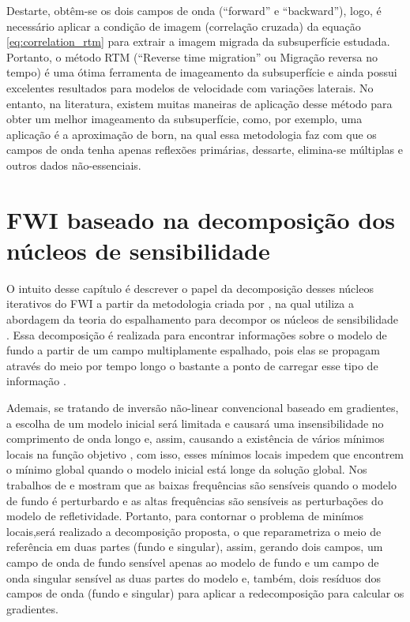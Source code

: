  Destarte, obtêm-se os dois campos de onda (``forward'' e ``backward''), logo, é necessário aplicar a condição de imagem (correlação cruzada) da equação \ref{eq:correlation_rtm} para extrair a imagem migrada da subsuperfície estudada. Portanto, o método RTM (``Reverse time migration'' ou Migração reversa no tempo) é uma ótima ferramenta de imageamento da subsuperfície e ainda possui excelentes resultados para modelos de velocidade com variações laterais. No entanto, na literatura, existem muitas maneiras de aplicação desse método para obter um melhor imageamento da subsuperfície, como, por exemplo, uma aplicação é a aproximação de born, na qual essa metodologia faz com que os campos de onda tenha apenas reflexões primárias, dessarte, elimina-se múltiplas e outros dados não-essenciais.

\section{FWI baseado na decomposição dos núcleos de sensibilidade}
O intuito desse capítulo é descrever o papel da decomposição desses núcleos iterativos do FWI a partir da metodologia criada por \citet{macedo_2014}, na qual utiliza a abordagem da teoria do espalhamento para decompor os núcleos de sensibilidade \citep{tarantola_linearized_1984}. Essa decomposição é realizada para encontrar informações sobre o  modelo de fundo a partir de um campo multiplamente espalhado, pois elas se propagam através do meio por tempo longo o bastante a ponto de carregar esse tipo de informação \citep{snieder_2002}. 

Ademais, se tratando de inversão não-linear convencional baseado em gradientes, a escolha de um modelo inicial será limitada e causará uma insensibilidade no comprimento de onda longo \citep{gauthier_1986,mora_1987,claerbout_1976,jannane_1989} e, assim, causando a existência de vários mínimos locais na função objetivo \citep{bunks_1995}, com isso, esses mínimos locais impedem que encontrem o mínimo global quando o modelo inicial está longe da solução global. Nos trabalhos de \citet{jannane_1989} e \citet{claerbout_1976} mostram que as baixas frequências são sensíveis quando o modelo de fundo é perturbardo e as altas frequências são sensíveis as perturbações do modelo de refletividade. Portanto, para contornar o problema de minímos locais,será  realizado a decomposição proposta, o que reparametriza o meio de referência em duas partes (fundo e singular), assim, gerando dois campos, um campo de onda de fundo sensível apenas ao modelo de fundo e um campo de onda singular sensível as duas partes do modelo e, também, dois resíduos dos campos de onda (fundo e singular) para aplicar a redecomposição para calcular os gradientes. 


